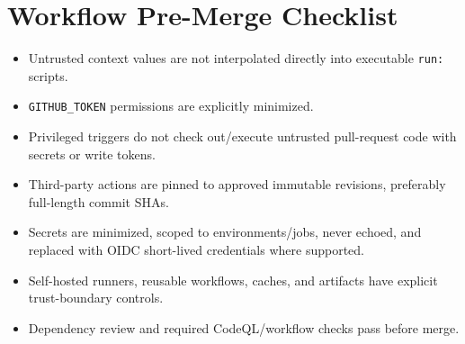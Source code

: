 \documentclass[10pt,letterpaper]{article}
\newcommand{\code}[1]{\texttt{\small #1}}
\begin{document}
\section{Workflow Pre-Merge Checklist}
\begin{itemize}[leftmargin=*,itemsep=2pt]
\item Untrusted context values are not interpolated directly into executable \code{run:} scripts.
\item \code{GITHUB\_TOKEN} permissions are explicitly minimized.
\item Privileged triggers do not check out/execute untrusted pull-request code with secrets or write tokens.
\item Third-party actions are pinned to approved immutable revisions, preferably full-length commit SHAs.
\item Secrets are minimized, scoped to environments/jobs, never echoed, and replaced with OIDC short-lived credentials where supported.
\item Self-hosted runners, reusable workflows, caches, and artifacts have explicit trust-boundary controls.
\item Dependency review and required CodeQL/workflow checks pass before merge.
\end{itemize}
\end{document}
